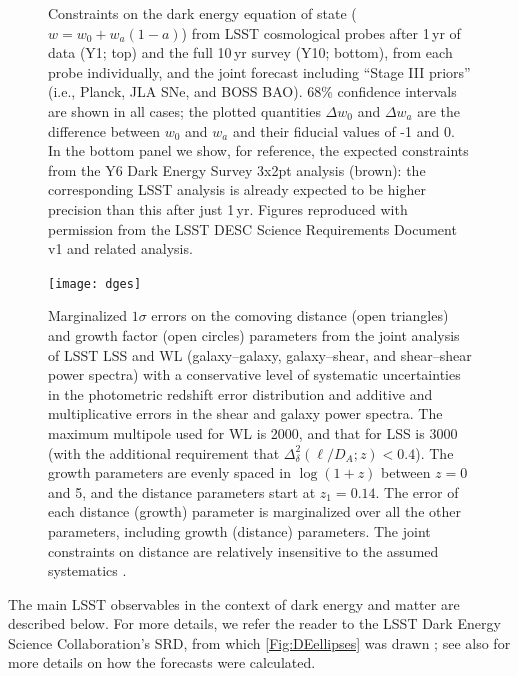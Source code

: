 \begin{figure}
\begin{center}
  \end{center}
  \vskip -0.2in
  \caption{Constraints on the dark energy equation of state ($w = w_0 +
  w_a(1-a)$) from LSST cosmological probes after 1\,yr of data (Y1;
  top) and the full 10\,yr survey (Y10; bottom), from each probe
  individually, and the joint forecast including ``Stage III priors''
  (i.e., Planck, JLA SNe, and BOSS BAO).
  68\%
  confidence intervals are shown in all cases; the plotted quantities
  $\Delta w_0$ and $\Delta w_a$ are the difference between $w_0$ and
  $w_a$ and their fiducial values of -1 and 0.
  In the bottom panel we show, for reference, the expected constraints
  from the Y6 Dark Energy Survey 3x2pt analysis (brown): the corresponding LSST analysis is already expected to be higher precision than this after just 1\,yr.
  Figures reproduced with permission from the LSST DESC Science Requirements Document v1 \citep{2018arXiv180901669T} and related analysis.
  \label{Fig:DEellipses}}
\end{figure}


\begin{figure}
\texttt{[image: dges]}
\caption{Marginalized $1\sigma$ errors on the comoving distance
(open triangles) and growth factor (open circles) parameters from
the joint analysis of LSST LSS and WL (galaxy--galaxy, galaxy--shear,
and shear--shear power spectra) with a
conservative level of systematic uncertainties in the photometric redshift error
distribution and additive and multiplicative errors in the shear and
galaxy power spectra. The maximum multipole used for WL is
2000, and that for LSS is 3000 (with the additional requirement that
$\Delta_\delta^2(\ell/D_{A};z) < 0.4$).
The growth parameters
are evenly spaced in
$\log(1+z)$ between $z = 0$ and 5, and the distance parameters
start at $z_1 = 0.14$.
The error of each distance (growth) parameter is marginalized
over all the other parameters, including growth (distance) parameters. The joint constraints on
distance are relatively insensitive to the assumed systematics
\citep{2009ApJ...690..923Z}.}
\label{Fig:bao2}
\end{figure}


The main LSST observables in the context of dark energy and matter are described below. For more details, we refer the reader to the LSST Dark Energy Science Collaboration's SRD, from which \autoref{Fig:DEellipses} was drawn \citep{2018arXiv180901669T}; see also \citet{2017MNRAS.470.2100K} for more details on how the forecasts were calculated.

